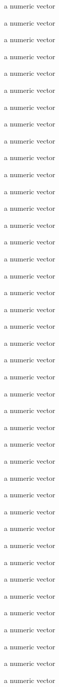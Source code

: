\begin{Format}
\begin{description}
\item[] a numeric vector
\item[] a numeric vector
\item[] a numeric vector
\item[] a numeric vector
\item[] a numeric vector
\item[] a numeric vector
\item[] a numeric vector
\item[] a numeric vector
\item[] a numeric vector
\item[] a numeric vector
\item[] a numeric vector
\item[] a numeric vector
\item[] a numeric vector
\item[] a numeric vector
\item[] a numeric vector
\item[] a numeric vector
\item[] a numeric vector
\item[] a numeric vector
\item[] a numeric vector
\item[] a numeric vector
\item[] a numeric vector
\item[] a numeric vector
\item[] a numeric vector
\item[] a numeric vector
\item[] a numeric vector
\item[] a numeric vector
\item[] a numeric vector
\item[] a numeric vector
\item[] a numeric vector
\item[] a numeric vector
\item[] a numeric vector
\item[] a numeric vector
\item[] a numeric vector
\item[] a numeric vector
\item[] a numeric vector
\item[] a numeric vector
\item[] a numeric vector
\item[] a numeric vector
\item[] a numeric vector
\item[] a numeric vector
\item[] a numeric vector


\end{description}
\end{Format}
